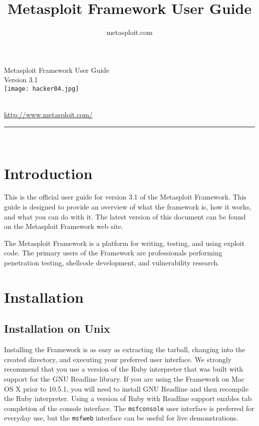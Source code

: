 \documentclass{report}
\begin{document}
\title{Metasploit Framework User Guide}
\author{metasploit.com}

\begin{titlepage}
    \begin{center}
        		
        \huge{Metasploit Framework User Guide}
		\ \\[10mm]
		\large{Version 3.1}
		\\[10mm]

		\texttt{[image: hacker04.jpg]}
		
		\ \\[10mm]
		
        \small{\url{http://www.metasploit.com/}}

        \rule{10cm}{1pt} \\[4mm]
        \renewcommand{\arraystretch}{0.5}
    \end{center}
\end{titlepage}

\tableofcontents

\setlength{\parindent}{0pt} \setlength{\parskip}{8pt}


\chapter{Introduction}

\par
This is the official user guide for version 3.1 of the Metasploit Framework. This 
guide is designed to provide an overview of what the framework is, how it works,
and what you can do with it. The latest version of this document can be found
on the Metasploit Framework web site. 

\par
The Metasploit Framework is a platform for writing, testing, and using exploit code.
The primary users of the Framework are professionals performing penetration testing,
shellcode development, and vulnerability research.

\par
\pagebreak

\chapter{Installation}

    \section{Installation on Unix}
    \label{INSTALL-UNIX}
\par
Installing the Framework is as easy as extracting the tarball, changing into the
created directory, and executing your preferred user interface. We strongly
recommend that you use a version of the Ruby interpreter that was built with
support for the GNU Readline library. If you are using the Framework on Mac OS
X prior to 10.5.1, you will need to install GNU Readline and then recompile the Ruby
interpreter.  Using a version of Ruby with Readline support enables tab completion
of the console interface.  The \texttt{msfconsole} user interface is preferred for everyday
use, but the \texttt{msfweb} interface can be useful for live demonstrations.
\end{document}
